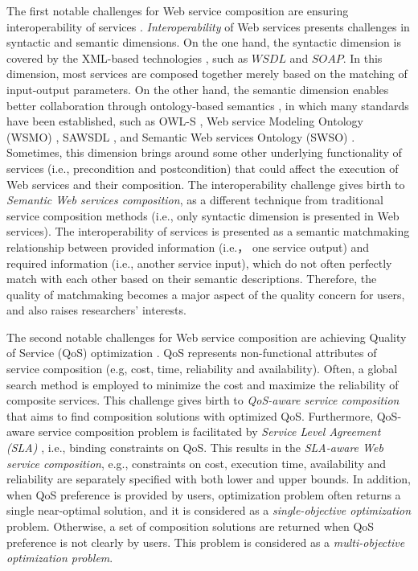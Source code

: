 The first notable challenges for Web service composition are ensuring interoperability of services \cite{fensel2011semantic}. \emph{Interoperability} of Web services presents challenges in syntactic and semantic dimensions. On the one hand, the syntactic dimension is covered by the XML-based technologies \cite{yu2008deploying}, such as $WSDL$ and $SOAP$. In this dimension, most services are composed together merely based on the matching of input-output parameters. On the other hand, the semantic dimension enables better collaboration through ontology-based semantics \cite{o2005review}, in which many standards have been established, such as OWL-S \cite{martin2004owl}, Web service Modeling Ontology (WSMO) \cite{lausen2005w3c}, SAWSDL \cite{kopecky2007sawsdl}, and Semantic Web services Ontology (SWSO) \cite{petrie2016web}. Sometimes, this dimension brings around some other underlying functionality of services (i.e., precondition and postcondition) that could affect the execution of Web services and their composition. The interoperability challenge gives birth to \emph{Semantic Web services composition}, as a different technique from traditional service composition methods (i.e., only syntactic dimension is presented in Web services). The interoperability of services is presented as a semantic matchmaking relationship between provided information (i.e.， one service output) and required information (i.e., another service input), which do not often perfectly match with each other based on their semantic descriptions. Therefore, the quality of matchmaking becomes a major aspect of the quality concern for users, and also raises researchers' interests. 


The second notable challenges for Web service composition are achieving Quality of Service (QoS) optimization \cite{fensel2011semantic}. QoS represents non-functional attributes of service composition (e.g, cost, time, reliability and availability). Often, a global search method is employed to minimize the cost and maximize the reliability of composite services. This challenge gives birth to \emph{QoS-aware service composition} that aims to find composition solutions with optimized QoS. Furthermore, QoS-aware service composition problem is facilitated by \emph{Service Level Agreement (SLA)} \cite{sahai2002automated}, i.e., binding constraints on QoS. This results in the \emph{SLA-aware Web service composition}, e.g., constraints on cost, execution time, availability and reliability are separately specified with both lower and upper bounds. In addition, when QoS preference is provided by users, optimization problem often returns a single near-optimal solution, and it is considered as a \emph{single-objective optimization} problem. Otherwise, a set of composition solutions are returned when QoS preference is not clearly by users. This problem is considered as a \emph{multi-objective optimization problem}.  

